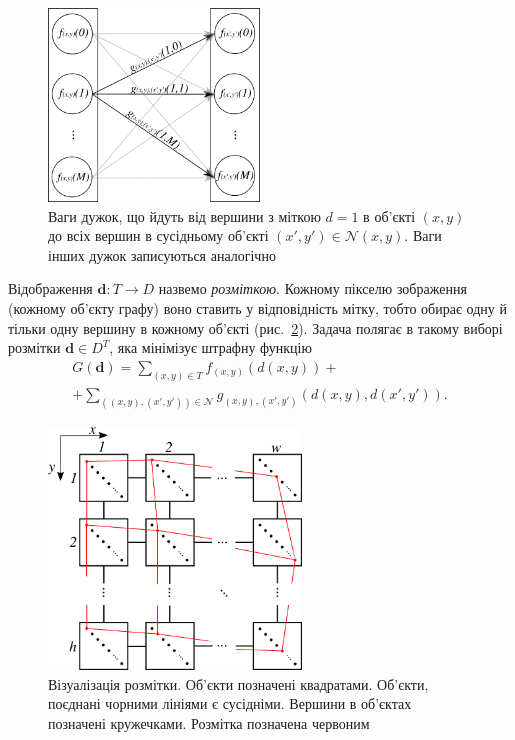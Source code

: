 \begin{figure}[h]
  \centering
  \includegraphics[width=0.5\textwidth]{images/neighbor_edge_weights}
  \caption{Ваги дужок, що йдуть від вершини з міткою $d = 1$ в об'єкті
           $\left(x, y \right)$ до всіх вершин в сусідньому об'єкті
           $\left(x', y' \right) \in \mathcal{N}\left(x, y \right)$.
           Ваги інших дужок записуються аналогічно}
  \label{fig:neighbor:edge:weights}
\end{figure}

Відображення $\pmb{d} : T \rightarrow D$ назвемо \textit{розміткою}.
Кожному пікселю зображення (кожному об'єкту графу)
воно ставить у відповідність мітку,
тобто обирає одну й тільки одну вершину в кожному об'єкті
(рис.~\ref{fig:labeling}).
Задача полягає в такому виборі розмітки $\pmb{d} \in D^T$,
яка мінімізує штрафну функцію
\begin{equation} \label{eq:overview:penalty}
\begin{gathered}
    G \left( \pmb{d} \right)
    = \sum \limits_{\left(x, y \right) \in T}
        f_{\left(x, y \right)} \left(d \left(x, y \right) \right) + \\
    + \sum \limits_{\left(\left(x, y \right), \left(x', y'\right) \right) \in \mathcal{N}}
        g_{\left(x, y \right), \left(x', y' \right)} \left(
            d \left( x, y \right), d \left( x', y' \right)
        \right).
\end{gathered}
\end{equation}

\begin{figure}[h]
  \centering
  \includegraphics[width=0.6\textwidth]{images/labeling}
  \caption{Візуалізація розмітки.
           Об'єкти позначені квадратами.
           Об'єкти, поєднані чорними лініями є сусідніми.
           Вершини в об'єктах позначені кружечками.
           Розмітка позначена червоним}
  \label{fig:labeling}
\end{figure}

